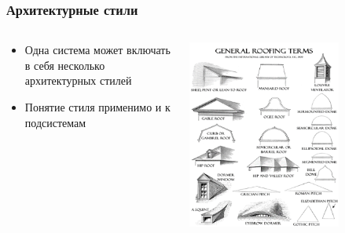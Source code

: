 \documentclass{../cscslides}
\begin{document}
    \begin{frame}
        \frametitle{Архитектурные стили}
        \begin{columns}
            \begin{column}{0.5\textwidth}
                \begin{itemize}
                    \item Одна система может включать в себя несколько архитектурных стилей
                    \item Понятие стиля применимо и к подсистемам
                \end{itemize}
            \end{column}
            \begin{column}{0.5\textwidth}
                \begin{center}
                    \includegraphics[width=0.7\textwidth]{roofStyles.png}
                \end{center}
            \end{column}
        \end{columns}
    \end{frame}
\end{document}
